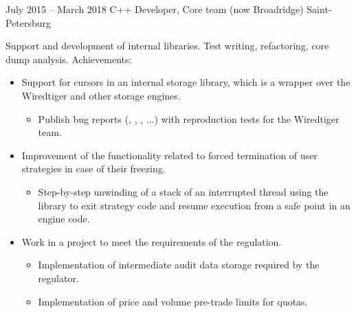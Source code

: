\documentclass[11pt,a4paper,sans]{moderncv}
\begin{document}
\cventry
{July 2015 -- March 2018}
{C++ Developer, Core team}
{(now Broadridge)}
{Saint-Petersburg}
{}
{Support and development of internal libraries. Test writing, refactoring, core dump analysis.\newline{}
Achievements:
\begin{itemize}
\item Support for  cursors in an internal storage library, which is a wrapper over the Wiredtiger and other storage engines.
  \begin{itemize}
  \item Publish bug reports (, , , ...) with reproduction tests for the Wiredtiger team.
  \end{itemize}
\item Improvement of the functionality related to forced termination of user strategies in case of their freezing.
  \begin{itemize}
  \item Step-by-step unwinding of a stack of an interrupted thread using the  library to exit strategy code and resume execution from a safe point in an engine code.
  \end{itemize}
\item Work in a project to meet the requirements of the  regulation.
  \begin{itemize}
  \item Implementation of intermediate audit data storage required by the regulator.
  \item Implementation of price and volume pre-trade limits for quotas.
  \end{itemize}
\end{itemize}}
\end{document}

